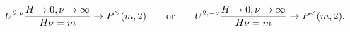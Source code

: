 \begin{equation} U^{2,\nu}
{{H\rightarrow 0,\nu \rightarrow\infty} \over H\nu=m}\rightarrow
 P^>(m,2)\qquad\mbox{or}\qquad U^{2,-\nu} {{H\rightarrow 0,\nu
\rightarrow\infty} \over H\nu=m}\rightarrow P^<(m,2).
\end{equation}

